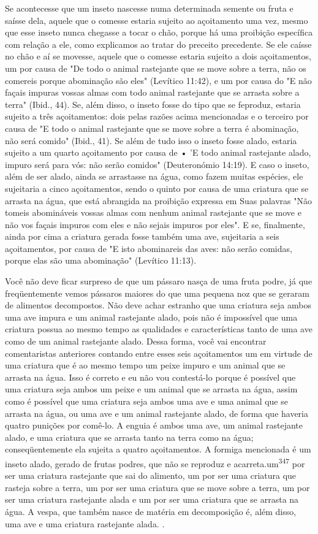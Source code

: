 Se acontecesse que um inseto nascesse numa determinada semente ou fruta
e saísse dela, aquele que o comesse estaria sujeito ao açoitamento uma
vez, mesmo que esse inseto nunca chegasse a tocar o chão, porque há uma
proi­bição específica com relação a ele, como explicamos ao tratar do
preceito prece­dente. Se ele caísse no chão e aí se movesse, aquele que
o comesse estaria sujeito a dois açoitamentos, um por causa de "De todo
o animal rastejante que se move sobre a terra, não os comereis porque
abominação são eles" (Levítico 11:42), e um por causa do "E não façais
impuras vossas almas com todo animal rastejante que se arrasta sobre a
terra" (Ibid., 44). Se, além disso, o inseto fosse do tipo que se
feproduz, estaria sujeito a três açoitamentos: dois pelas razões acima
mencio­nadas e o terceiro por causa de "E todo o animal rastejante que
se move sobre a terra é abominação, não será comido" (Ibid., 41). Se
além de tudo isso o inseto fosse alado, estaria sujeito a um quarto
açoitamento por causa de • 'E todo animal rastejante alado, impuro será
para vós: não serão comidos" (Deuteronómio 14:19). E caso o inseto, além
de ser alado, ainda se arrastasse na água, como fazem muitas espécies,
ele sujeitaria a cinco açoitamentos, sendo o quinto por causa de uma
criatura que se arrasta na água, que está abrangida na proibição
expressa em Suas palavras "Não tomeis abomináveis vossas almas com
nenhum animal rastejante que se move e não vos façais impuros com eles e
não sejais impuros por eles". E se, finalmente, ainda por cima a
criatura gerada fosse também uma ave, sujeita­ria a seis açoitamentos,
por causa de "E isto abominareis das aves: não serão co­midas, porque
elas são uma abominação" (Levítico 11:13).

Você não deve ficar surpreso de que um pássaro nasça de uma fruta podre,
já que freqüentemente vemos pássaros maiores do que uma pequena noz que
se geraram de alimentos decompostos. Não deve achar estranho que uma
criatura seja ambos uma ave impura e um animal rastejante alado, pois
não é impossível que uma criatura possua ao mesmo tempo as qualidades e
caracte­rísticas tanto de uma ave como de um animal rastejante alado.
Dessa forma, você vai encontrar comentaristas anteriores contando entre
esses seis açoita­mentos um em virtude de uma criatura que é ao mesmo
tempo um peixe impu­ro e um animal que se arrasta na água. Isso é
correto e eu não vou contestá-lo porque é possível que uma criatura seja
ambos um peixe e um animal que se arrasta na água, assim como é possível
que uma criatura seja ambos uma ave e uma animal que se arrasta na água,
ou uma ave e um animal rastejante alado, de forma que haveria quatro
punições por comê-lo. A enguia é ambos uma ave, um animal rastejante
alado, e uma criatura que se arrasta tanto na terra como na água;
conseqüentemente ela sujeita a quatro açoitamentos. A formiga
men­cionada é um inseto alado, gerado de frutas podres, que não se
reproduz e acar­reta.um\textsuperscript{347} por ser
uma criatura rastejante que sai do alimento, um por ser uma criatura que
rasteja sobre a terra, um por ser uma criatura que se move sobre a
terra, um por ser uma criatura rastejante alada e um por ser uma
criatura que se arrasta na água. A vespa, que também nasce de matéria em
decomposição é, além disso, uma ave e uma criatura rastejante alada. .

